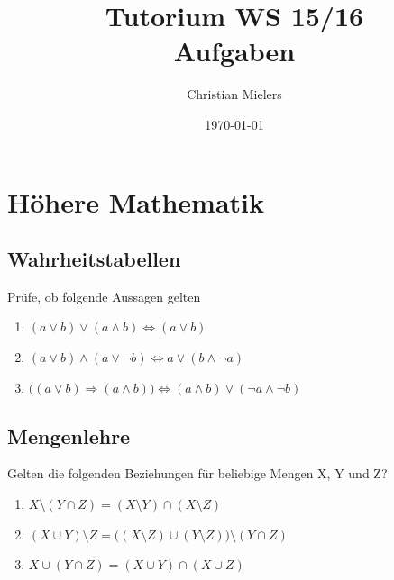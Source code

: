 \documentclass[11pt, a4paper]{article}
\title{Tutorium WS 15/16 \\ Aufgaben}
\author{Christian Mielers}
\date{\today}
\begin{document}
\maketitle
\tableofcontents

\newpage
\section{Höhere Mathematik}
\subsection{Wahrheitstabellen}
Prüfe, ob folgende Aussagen gelten
\begin{enumerate}
	\item $(a \lor b) \lor (a \land b) \Leftrightarrow (a \lor b)$
	\item $(a \lor b) \land (a \lor \lnot b) \Leftrightarrow a \lor (b \land \lnot a)$
	\item $\big((a \lor b) \Rightarrow (a \land b) \big) \Leftrightarrow (a \land b) \lor (\lnot a \land \lnot b)$
\end{enumerate}

\subsection{Mengenlehre}
Gelten die folgenden Beziehungen für beliebige Mengen X, Y und Z?
\begin{enumerate}
	\item $X \setminus (Y \cap Z) = (X \setminus Y) \cap (X \setminus Z)$ %
	\item $(X \cup Y) \setminus Z = \big((X \setminus Z) \cup (Y \setminus Z)\big) \setminus (Y \cap Z)$ %
	\item $X \cup (Y \cap Z) = (X \cup Y) \cap (X \cup Z)$ %
\end{enumerate}
\end{document}
